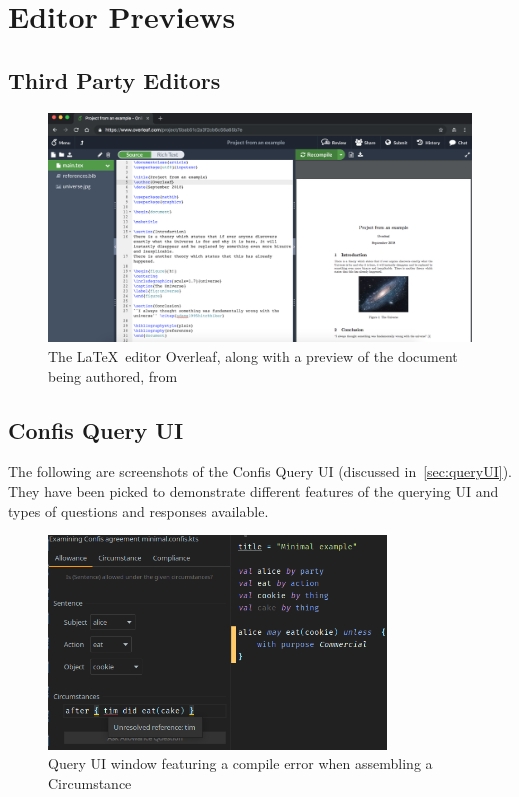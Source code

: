 \chapter{Editor Previews}\label{ch:editor-previews}

\section{Third Party Editors}\label{sec:third-partty-editors}

\begin{figure}[h]
    \centering
    \includegraphics[width=\textwidth]{figures/overleafEditor}
    \caption{The \LaTeX \ editor Overleaf, along with a preview of the document being authored, from~\cite{overleafDocs}}
    \label{fig:overleafPreview}
\end{figure}

\section{Confis Query UI}\label{sec:app:confis-query-ui}

The following are screenshots of the Confis Query UI (discussed in~\autoref{sec:queryUI}).
They have been picked to demonstrate different features of the querying UI and types of questions and responses available.

\begin{figure}[h]
    \centering
    \includegraphics[width=0.8\textwidth]{figures/queryUi-compileError}
    \caption{Query UI window featuring a compile error when assembling a Circumstance}
    \label{fig:queryUI:circumstanceError}
\end{figure}

